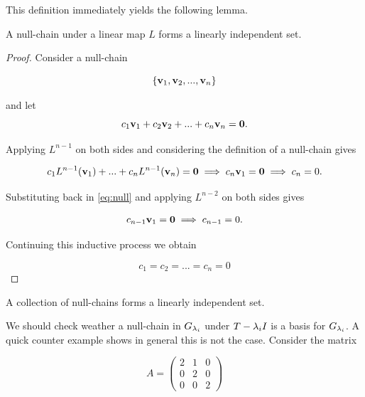 This definition immediately yields the following lemma. 
\begin{lemma}\label{lem:nullchain-indp}
    A null-chain under a linear map \( L \) forms a linearly independent set.
\end{lemma}

\begin{proof}
    Consider a null-chain

    \begin{equation*}
        \{\mathbf{v}_1,\mathbf{v}_2,...,\mathbf{v}_n\}
    \end{equation*}

    and let
    \begin{equation}\label{eq:null}
        c_1\mathbf{v}_1+c_2\mathbf{v}_2+...+c_n\mathbf{v}_n=\mathbf{0}.
    \end{equation}


    Applying \(L^{n-1}\) on both sides and considering the definition of a null-chain gives

    \begin{equation*}
        c_1L^{n-1}(\mathbf{v}_1)+...+c_nL^{n-1}(\mathbf{v}_n)=\mathbf{0}\implies c_n\mathbf{v}_1=\mathbf{0}\implies c_n=0.
    \end{equation*}

    Substituting back in \eqref{eq:null} and applying \(L^{n-2}\) on both sides gives

    \begin{equation*}
        c_{n-1}\mathbf{v}_1=\mathbf{0}\implies c_{n-1}=0.
    \end{equation*}

    Continuing this inductive process we obtain

    \begin{equation*}
        c_1=c_2=...=c_n=0
    \end{equation*}
\end{proof}

\begin{corollary}\label{col:nullchainS}
    A collection of null-chains forms a linearly independent set.
\end{corollary}


 We should check weather a null-chain in \(G_{\lambda_i}\) under \(T-\lambda_iI\) is a basis for \(G_{\lambda_i}\).
A quick counter example shows in general this is not the case.
Consider the matrix

\begin{equation*}
    A=\begin{pmatrix}
        2 & 1 & 0 \\
        0 & 2 & 0 \\
        0 & 0 & 2
    \end{pmatrix}
\end{equation*}

